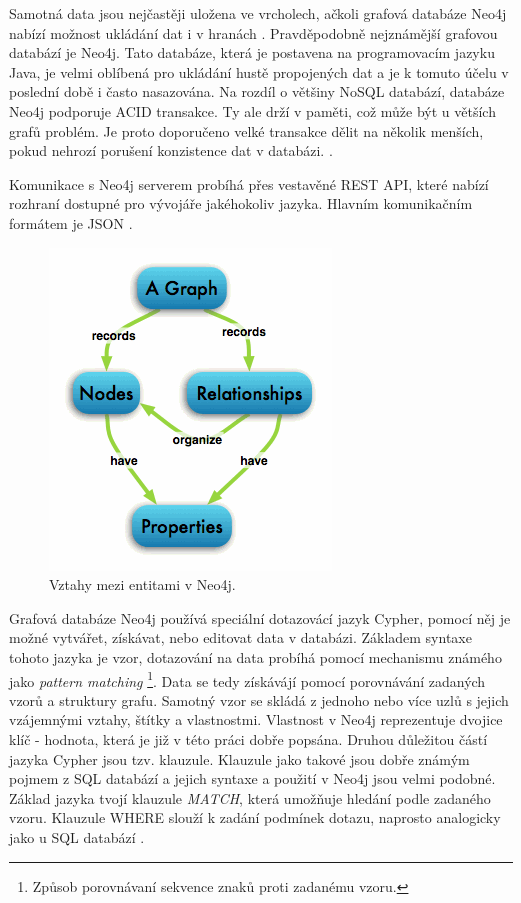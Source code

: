Samotná data jsou nejčastěji uložena ve vrcholech, ačkoli grafová databáze Neo4j nabízí možnost ukládání dat i v hranách \cite{neo4j}.
Pravděpodobně nejznámější grafovou databází je Neo4j. Tato databáze, která je postavena na programovacím jazyku Java, je velmi oblíbená pro ukládání hustě propojených dat a je k tomuto účelu v poslední době i často nasazována. Na rozdíl o většiny NoSQL databází, databáze Neo4j podporuje ACID transakce. Ty ale drží v paměti, což může být u větších grafů problém. Je proto doporučeno velké transakce dělit na několik menších, pokud nehrozí porušení konzistence dat v databázi. \cite{neo4j}.

Komunikace s Neo4j serverem probíhá přes vestavěné REST API, které nabízí rozhraní dostupné pro vývojáře jakéhokoliv jazyka. Hlavním komunikačním formátem je JSON \cite{neo4j}.

\begin{figure}[h]
\begin{centering}
\includegraphics[scale=0.5]{obrazky/neo4j-graph}
\par\end{centering}
\caption{Vztahy mezi entitami v Neo4j. \cite{neo4j}}
\end{figure}

\FloatBarrier
Grafová databáze Neo4j používá speciální dotazovácí jazyk Cypher, pomocí něj je možné vytvářet, získávat, nebo editovat data v databázi. Základem syntaxe tohoto jazyka je vzor, dotazování na data probíhá pomocí mechanismu známého jako \emph{pattern matching} \footnote{Způsob porovnávaní sekvence znaků proti zadanému vzoru.}. Data se tedy získávájí pomocí porovnávání zadaných vzorů a struktury grafu. Samotný vzor se skládá z jednoho nebo více uzlů s jejich vzájemnými vztahy, štítky a vlastnostmi. Vlastnost v Neo4j reprezentuje dvojice klíč - hodnota, která je již v této práci dobře popsána. Druhou důležitou částí jazyka Cypher jsou tzv. klauzule. Klauzule jako takové jsou dobře známým pojmem z SQL databází a jejich syntaxe a použití v Neo4j jsou velmi podobné. Základ jazyka tvojí klauzule \emph{MATCH}, která umožňuje hledání podle zadaného vzoru. Klauzule WHERE slouží k zadání podmínek dotazu, naprosto analogicky jako u SQL databází \cite{cypher}. 
 
